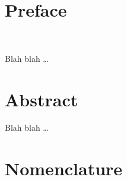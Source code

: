 \chapter*{Preface}
\

Blah blah \dots

 \cleardoublepage


 \setcounter{tocdepth}{2}
 \tableofcontents

 \cleardoublepage





\chapter*{Abstract}

Blah blah \dots

 \cleardoublepage


\chapter*{Nomenclature}\label{chap:symbole}


